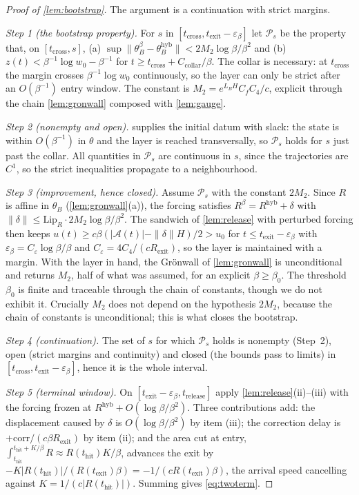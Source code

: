 \documentclass[11pt]{article}
\theoremstyle{definition}
\theoremstyle{remark}
\newcommand{\thit}{t_{\mathrm{hit}}}
\newcommand{\texit}{t_{\mathrm{exit}}}
\newcommand{\trel}{t_{\mathrm{release}}}
\newcommand{\Ar}{\mathcal{A}}                      %
\newcommand{\hyb}{\mathrm{hyb}}
\begin{document}
\begin{proof}[Proof of \cref{lem:bootstrap}]
The argument is a continuation with strict margins.

\emph{Step 1 (the bootstrap property).} For $s$ in
$[t_{\mathrm{cross}},\texit-\varepsilon_\beta]$ let $\mathcal P_s$ be the
property that, on $[t_{\mathrm{cross}},s]$, (a)
$\sup\|\theta_B^\beta-\theta_B^{\hyb}\|<2M_2\log\beta/\beta^{2}$ and (b)
$z(t)<\beta^{-1}\log w_0-\beta^{-1}$ for $t\ge
t_{\mathrm{cross}}+C_{\mathrm{collar}}/\beta$.
The collar is necessary: at $t_{\mathrm{cross}}$ the margin crosses
$\beta^{-1}\log w_0$ continuously, so the layer can only be strict after an
$O(\beta^{-1})$ entry window. The constant is
$M_2=e^{L_BH}C_fC_4/c$, explicit through the chain \cref{lem:gronwall} composed
with \cref{lem:gauge}.

\emph{Step 2 (nonempty and open).}  supplies the initial
datum with slack: the state is within $O(\beta^{-1})$ in $\theta$ and the layer is
reached transversally, so $\mathcal P_s$ holds for $s$ just past the collar. All
quantities in $\mathcal P_s$ are continuous in $s$, since the trajectories are
$C^1$, so the strict inequalities propagate to a neighbourhood.

\emph{Step 3 (improvement, hence closed).} Assume $\mathcal P_s$ with the
constant $2M_2$. Since $R$ is affine in $\theta_B$ (\cref{lem:gronwall}(a)), the
forcing satisfies $R^\beta=R^{\hyb}+\delta$ with
$\|\delta\|\le\mathrm{Lip}_R\cdot2M_2\log\beta/\beta^{2}$. The sandwich of
\cref{lem:release} with perturbed forcing then keeps
$u(t)\ge c\beta(|\Ar(t)|-\|\delta\|H)/2>u_0$ for $t\le\texit-\varepsilon_\beta$
with $\varepsilon_\beta=C_\varepsilon\log\beta/\beta$ and
$C_\varepsilon=4C_4/(cR_{\mathrm{exit}})$, so the layer is maintained with a
margin. With the layer in hand, the Gr\"onwall of \cref{lem:gronwall} is
unconditional and returns $M_2$, half of what was assumed, for an explicit
$\beta\ge\beta_0$. The threshold $\beta_0$ is finite and traceable through the
chain of constants, though we do not exhibit it. Crucially $M_2$ does not depend
on the hypothesis $2M_2$, because the chain of constants is unconditional; this
is what closes the bootstrap.

\emph{Step 4 (continuation).} The set of $s$ for which $\mathcal P_s$ holds is
nonempty (Step~2), open (strict margins and continuity) and closed (the bounds
pass to limits) in $[t_{\mathrm{cross}},\texit-\varepsilon_\beta]$, hence it is
the whole interval.

\emph{Step 5 (terminal window).} On
$[\texit-\varepsilon_\beta,\trel]$ apply \cref{lem:release}(ii)--(iii) with the
forcing frozen at $R^{\hyb}+O(\log\beta/\beta^{2})$. Three contributions add: the
displacement caused by $\delta$ is $O(\log\beta/\beta^{2})$ by item (iii); the
correction delay is $+\mathrm{corr}/(c\beta R_{\mathrm{exit}})$ by item (ii); and
the area cut at entry, $\int_{\thit}^{\thit+K/\beta}R\approx R(\thit)K/\beta$,
advances the exit by $-K|R(\thit)|/(R(\texit)\beta)=-1/(cR(\texit)\beta)$, the
arrival speed cancelling against $K=1/(c|R(\thit)|)$. Summing gives
\eqref{eq:twoterm}.
\end{proof}
\end{document}
